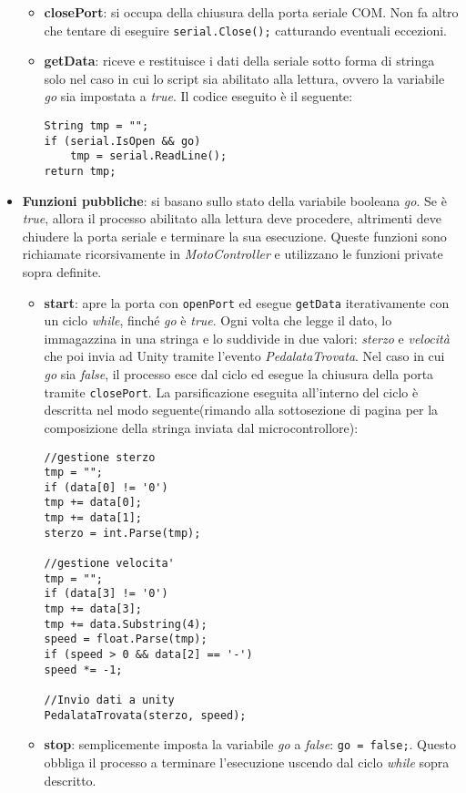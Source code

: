 \begin{itemize}
\begin{itemize}
   \item \textbf{closePort}: si occupa della chiusura della porta seriale COM. Non fa altro che tentare di eseguire \texttt{serial.Close();} catturando eventuali eccezioni.
   \item \textbf{getData}: riceve e restituisce i dati della seriale sotto forma di stringa solo nel caso in cui lo script sia abilitato alla lettura, ovvero la variabile \textit{go} sia impostata a \textit{true}. Il codice eseguito è il seguente:
\begin{lstlisting}
String tmp = "";
if (serial.IsOpen && go)
	tmp = serial.ReadLine();
return tmp;
\end{lstlisting}
\end{itemize}%

  \item \textbf{Funzioni pubbliche}: si basano sullo stato della variabile booleana \textit{go}. Se è \textit{true}, allora il processo abilitato alla lettura deve procedere, altrimenti deve chiudere la porta seriale e terminare la sua esecuzione. Queste funzioni sono richiamate ricorsivamente in \textit{MotoController} e utilizzano le funzioni private sopra definite.
\begin{itemize}
   \item \textbf{start}: apre la porta con \texttt{openPort} ed esegue \texttt{getData} iterativamente con un ciclo \textit{while}, finché \textit{go} è \textit{true}. Ogni volta che legge il dato, lo immagazzina in una stringa e lo suddivide in due valori: \textit{sterzo} e \textit{velocità} che poi invia ad Unity tramite l'evento \textit{PedalataTrovata}. Nel caso in cui \textit{go} sia \textit{false}, il processo esce dal ciclo ed esegue la chiusura della porta tramite \texttt{closePort}. La parsificazione eseguita all'interno del ciclo è descritta nel modo seguente(rimando alla sottosezione \textit{} di pagina \pageref{stringa} per la composizione della stringa inviata dal microcontrollore):
\begin{lstlisting}
//gestione sterzo
tmp = "";
if (data[0] != '0')
tmp += data[0];
tmp += data[1];
sterzo = int.Parse(tmp);

//gestione velocita'
tmp = "";
if (data[3] != '0')
tmp += data[3];
tmp += data.Substring(4);
speed = float.Parse(tmp);
if (speed > 0 && data[2] == '-')
speed *= -1;

//Invio dati a unity
PedalataTrovata(sterzo, speed);
\end{lstlisting}

\item \textbf{stop}: semplicemente imposta la variabile \textit{go} a \textit{false}: \texttt{go = false;}. Questo obbliga il processo a terminare l'esecuzione uscendo dal ciclo \textit{while} sopra descritto.
\end{itemize}%
\end{itemize}%
\newpage

